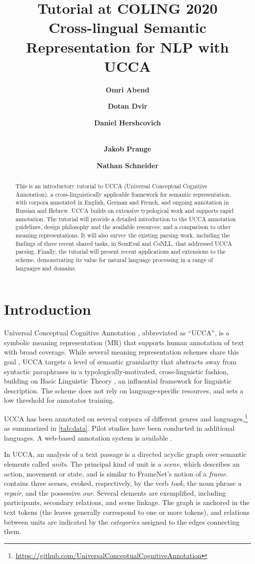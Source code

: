 \documentclass[11pt,table]{article}
\title{Tutorial at COLING 2020 \\
Cross-lingual Semantic Representation for NLP with UCCA}
\author[*]{\textbf{Omri Abend}}
\author[*]{\textbf{Dotan Dvir}}
\author[**]{\textbf{Daniel Hershcovich}}
\author[***]{\\\textbf{Jakob Prange}}
\author[***]{\textbf{Nathan Schneider}}
\affil[*]{Hebrew University of Jerusalem}
\affil[**]{University of Copenhagen}
\affil[***]{Georgetown University}
\affil[ ]{
\texttt{oabend@cs.huji.ac.il},\quad
\texttt{dotan.dvir@mail.huji.ac.il},\quad
\texttt{dh@di.ku.dk}}
\affil[ ]{
\texttt{jakob@cs.georgetown.edu},\quad
\texttt{nathan.schneider@georgetown.edu}
}
\begin{document}
\maketitle

\begin{abstract}
This is an introductory tutorial to UCCA (Universal Conceptual Cognitive Annotation), a cross-linguistically applicable framework for semantic representation, with corpora annotated in English, German and French, and ongoing annotation in Russian and Hebrew. UCCA builds on extensive typological work and supports rapid annotation. The tutorial will provide a detailed introduction to the UCCA annotation guidelines, design philosophy and the available resources; and a comparison to other meaning representations. It will also survey the existing parsing work, including the findings of three recent shared tasks, in SemEval and CoNLL, that addressed UCCA parsing. Finally, the tutorial will present recent applications and extensions to the scheme, demonstrating its value for natural language processing in a range of languages and domains.
\end{abstract}


\section{Introduction}\label{sec:introduction}

Universal Conceptual Cognitive Annotation \cite{abend2013universal}, abbreviated as ``UCCA'',
is a symbolic meaning representation (MR)
that supports human annotation of text with broad coverage.
While several meaning representation schemes share this goal
\cite{abend2017state}, UCCA targets a level of semantic granularity that abstracts away from syntactic paraphrases in a typologically-motivated, cross-linguistic fashion, building on Basic Linguistic Theory \cite{Dixon:basic}, an influential framework for linguistic description.
The scheme does not rely on language-specific resources, and sets a low
threshold for annotator training.

UCCA has been annotated on several corpora of different genres and
languages,\footnote{\url{https://github.com/UniversalConceptualCognitiveAnnotation}} as summarized in \cref{tab:data}.
Pilot studies have been conducted in additional languages.
A web-based annotation system is available \cite{abend2017uccaapp}.

In UCCA, an analysis of a text passage is a directed acyclic graph
over semantic elements called \textit{units}.
The principal kind of unit is a \textit{scene},
which describes an action, movement or state, and is similar to FrameNet's notion of a {\it frame}.
 contains three scenes, evoked, respectively,
by the verb \textit{took},
the noun phrase \textit{a repair}, and the possessive \textit{our}.
Several elements are exemplified, including participants,
secondary relations, and scene linkage.
The graph is anchored in the text tokens (the leaves generally correspond to one or more tokens), and relations between units
are indicated by the \textit{categories} assigned to the edges connecting them.
\end{document}
